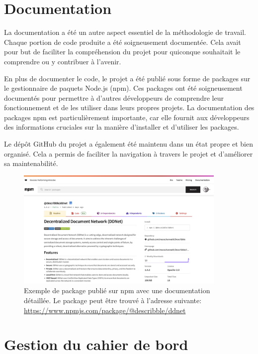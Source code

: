 \section{Documentation}

La documentation a été un autre aspect essentiel de la méthodologie de travail. Chaque portion de code produite a été soigneusement documentée. Cela avait pour but de faciliter la compréhension du projet pour quiconque souhaitait le comprendre ou y contribuer à l'avenir.

En plus de documenter le code, le projet a été publié sous forme de packages sur le gestionnaire de paquets Node.js (npm). Ces packages ont été soigneusement documentés pour permettre à d'autres développeurs de comprendre leur fonctionnement et de les utiliser dans leurs propres projets. La documentation des packages npm est particulièrement importante, car elle fournit aux développeurs des informations cruciales sur la manière d'installer et d'utiliser les packages.

Le dépôt GitHub du projet a également été maintenu dans un état propre et bien organisé. Cela a permis de faciliter la navigation à travers le projet et d'améliorer sa maintenabilité.

\begin{figure}[H]
    \centering
    \includegraphics[width=0.9\textwidth]{assets/figures/npm-package.png}
    \caption{Exemple de package publié sur npm avec une documentation détaillée. Le package peut être trouvé à l'adresse suivante: \url{https://www.npmjs.com/package/@describble/ddnet}}
\end{figure}

\section{Gestion du cahier de bord}

